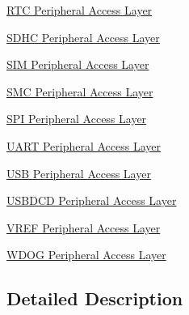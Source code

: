 \begin{DoxyCompactItemize}
\hyperlink{group__RTC__Peripheral__Access__Layer}{R\+T\+C Peripheral Access Layer}
\item 
\hyperlink{group__SDHC__Peripheral__Access__Layer}{S\+D\+H\+C Peripheral Access Layer}
\item 
\hyperlink{group__SIM__Peripheral__Access__Layer}{S\+I\+M Peripheral Access Layer}
\item 
\hyperlink{group__SMC__Peripheral__Access__Layer}{S\+M\+C Peripheral Access Layer}
\item 
\hyperlink{group__SPI__Peripheral__Access__Layer}{S\+P\+I Peripheral Access Layer}
\item 
\hyperlink{group__UART__Peripheral__Access__Layer}{U\+A\+R\+T Peripheral Access Layer}
\item 
\hyperlink{group__USB__Peripheral__Access__Layer}{U\+S\+B Peripheral Access Layer}
\item 
\hyperlink{group__USBDCD__Peripheral__Access__Layer}{U\+S\+B\+D\+C\+D Peripheral Access Layer}
\item 
\hyperlink{group__VREF__Peripheral__Access__Layer}{V\+R\+E\+F Peripheral Access Layer}
\item 
\hyperlink{group__WDOG__Peripheral__Access__Layer}{W\+D\+O\+G Peripheral Access Layer}
\end{DoxyCompactItemize}


\subsection{Detailed Description}
